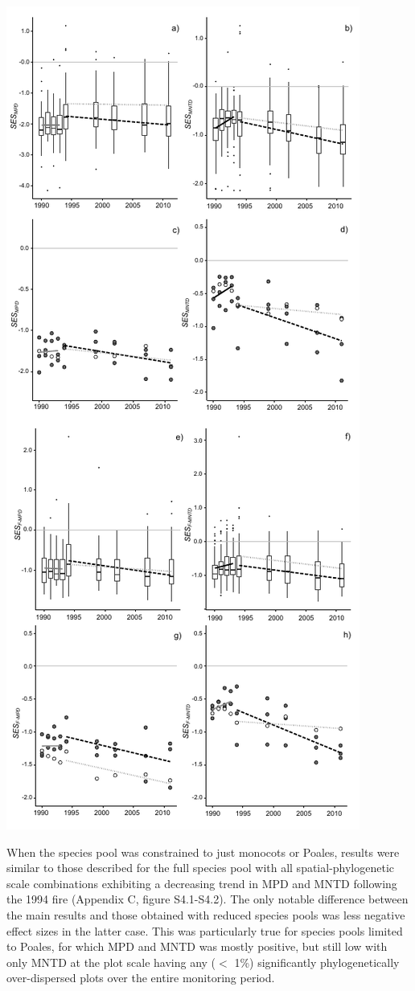 \begin{FPfigure}
 {\includegraphics[width=0.65\linewidth]{Chapter4/Figs/eightpanel_resizefont.pdf}}
 \end{FPfigure}

When the species pool was constrained to just monocots or Poales, results were similar to those described for the full species pool with all spatial-phylogenetic scale combinations exhibiting a decreasing trend in MPD and MNTD following the 1994 fire (Appendix C, figure S4.1-S4.2). The only notable difference between the main results and those obtained with reduced species pools was less negative effect sizes in the latter case. This was particularly true for species pools limited to Poales, for which MPD and MNTD was mostly positive, but still low with only MNTD at the plot scale having any ($<$ 1\%) significantly phylogenetically over-dispersed plots over the entire monitoring period. 

